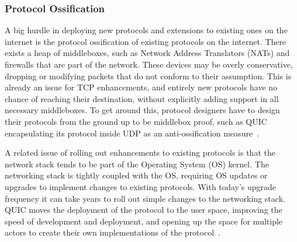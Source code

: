 \documentclass[english, 12pt, a4paper, elec, utf8, a-2b, online]{aaltothesis}
\begin{document}
\subsubsection{Protocol Ossification}
A big hurdle in deploying new protocols and extensions to existing ones on the internet
is the protocol ossification of existing protocols on the internet. There exists a heap
of middleboxes, such as Network Address Translators (NATs) and firewalls that are
part of the network. These devices may be overly conservative, dropping or 
modifying packets that do not conform to their assumption. This is already an
issue for TCP enhancements, and entirely new protocols have no chance of reaching
their destination, without explicitly adding support in all necessary middleboxes.
To get around this, protocol designers have to design their protocols from the ground
up to be middlebox proof, such as QUIC encapsulating its protocol inside UDP as an
anti-ossification measure~\cite{Ossification}.

A related issue of rolling out enhancements to existing protocols is that the
network stack tends to be part of the Operating System (OS) kernel. The networking
stack is tightly coupled with the OS, requiring OS updates or upgrades to implement
changes to existing protocols. With today's upgrade frequency it can take years
to roll out simple changes to the networking stack. QUIC moves the deployment of the 
protocol to the user space, improving the speed of development and deployment,
and opening up the space for multiple actors to create their own implementations of
the protocol~\cite{quic_transport_protocol_design}.
\end{document}
